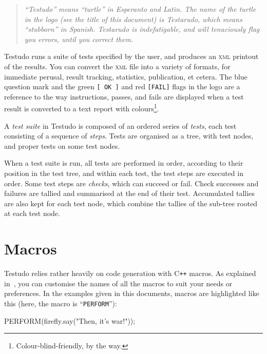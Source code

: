 \documentclass[twoside, a4paper, article]{memoir}
\newcommand*\Cpp{C\texttt{++}}
\begin{document}
\vspace{1\baselineskip}

\begin{quote}
  \emph{``Testudo'' means ``turtle'' in Esperanto and Latin.  The name of the
    turtle in the logo (see the title of this document) is Testarudo, which
    means ``stubborn'' in Spanish.  Testarudo is indefatigable, and will
    tenaciously flag you errors, until you correct them.}
\end{quote}

\vspace{1\baselineskip}

Testudo runs a suite of tests specified by the user, and produces an
\textsc{xml} printout of the results.  You can convert the \textsc{xml} file
into a variety of formats, for immediate perusal, result tracking, statistics,
publication, et cetera.  The blue question mark and the green \verb|[ OK ]| and
red \verb|[FAIL]| flags in the logo are a reference to the way instructions,
passes, and fails are displayed when a test result is converted to a text
report with colours\footnote{Colour-blind-friendly, by the way.}.

A \emph{test suite} in Testudo is composed of an ordered series of
\emph{tests}, each test consisting of a sequence of \emph{steps}.  Tests are
organised as a tree, with test nodes, and proper tests on some test nodes.

When a test suite is run, all tests are performed in order, according to their
position in the test tree, and within each test, the test steps are executed in
order.  Some test steps are \emph{checks}, which can succeed or fail.  Check
successes and failures are tallied and summarised at the end of their test.
Accumulated tallies are also kept for each test node, which combine the tallies
of the sub-tree rooted at each test node.

\section{Macros}
\label{sec:macros}

Testudo relies rather heavily on code generation with \Cpp{} macros.  As
explained in~, you can customise the names of all
the macros to suit your needs or preferences.  In the examples given in this
documents, macros are highlighted like this (here, the macro is
``\texttt{PERFORM}''):
\begin{cpplisting}
PERFORM(firefly.say("Then, it's war!"));
\end{cpplisting}
\end{document}
